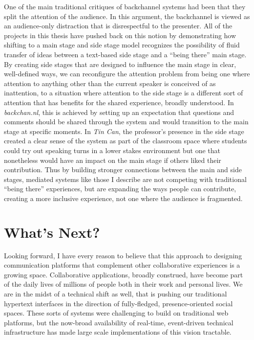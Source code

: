 One of the main traditional critiques of backchannel systems had been that they split the attention of the audience. In this argument, the backchannel is viewed as an audience-only distraction that is disrespectful to the presenter. All of the projects in this thesis have pushed back on this notion by demonstrating how shifting to a main stage and side stage model recognizes the possibility of fluid transfer of ideas between a text-based side stage and a ``being there'' main stage. By creating side stages that are designed to influence the main stage in clear, well-defined ways, we can reconfigure the attention problem from being one where attention to anything other than the current speaker is conceived of as inattention, to a situation where attention to the side stage is a different sort of attention that has benefits for the shared experience, broadly understood. In \emph{backchan.nl}, this is achieved by setting up an expectation that questions and comments should be shared through the system and would transition to the main stage at specific moments. In \emph{Tin Can}, the professor's presence in the side stage created a clear sense of the system as part of the classroom space where students could try out speaking turns in a lower stakes environment but one that nonetheless would have an impact on the main stage if others liked their contribution. Thus by building stronger connections between the main and side stages, mediated systems like those I describe are not competing with traditional ``being there'' experiences, but are expanding the ways people can contribute, creating a more inclusive experience, not one where the audience is fragmented.





\section{What's Next?}
Looking forward, I have every reason to believe that this approach to designing communication platforms that complement other collaborative experiences is a growing space. Collaborative applications, broadly construed, have become part of the daily lives of millions of people both in their work and personal lives. We are in the midst of a technical shift as well, that is pushing our traditional hypertext interfaces in the direction of fully-fledged, presence-oriented social spaces. These sorts of systems were challenging to build on traditional web platforms, but the now-broad availability of real-time, event-driven technical infrastructure has made large scale implementations of this vision tractable.

